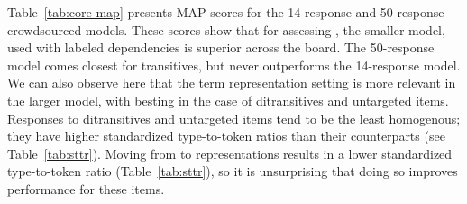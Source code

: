 Table~\ref{tab:core-map} presents  MAP scores for the 14-response and 50-response crowdsourced models. These scores show that for assessing , the smaller model, used with labeled dependencies is superior across the board. The 50-response model comes closest for transitives, but never outperforms the 14-response model. We can also observe here that the term representation setting is more relevant in the larger model, with  besting  in the case of ditransitives and untargeted items. Responses to ditransitives and untargeted items tend to  be the least homogenous; they have higher standardized type-to-token ratios than their counterparts (see Table~\ref{tab:sttr}). Moving from  to  representations results in a lower standardized type-to-token ratio (Table~\ref{tab:sttr}), so it is unsurprising that doing so improves performance for these items.

